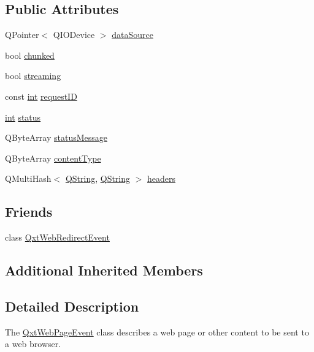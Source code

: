 \subsection*{Public Attributes}
\begin{DoxyCompactItemize}
\item 
Q\-Pointer$<$ Q\-I\-O\-Device $>$ \hyperlink{class_qxt_web_page_event_ae348a623f5b063e3dfa79ad4faf8ffd6}{data\-Source}
\item 
bool \hyperlink{class_qxt_web_page_event_a06310e86eecb41b64ea256acd0e0ff3b}{chunked}
\item 
bool \hyperlink{class_qxt_web_page_event_a7e523943475e8db70ddadc3b6303fe34}{streaming}
\item 
const \hyperlink{ioapi_8h_a787fa3cf048117ba7123753c1e74fcd6}{int} \hyperlink{class_qxt_web_page_event_a144c8010cc1c9d239bf5de4c72d09f7a}{request\-I\-D}
\item 
\hyperlink{ioapi_8h_a787fa3cf048117ba7123753c1e74fcd6}{int} \hyperlink{class_qxt_web_page_event_a3faa95fe00502400daa87a3a88e50d86}{status}
\item 
Q\-Byte\-Array \hyperlink{class_qxt_web_page_event_a4462b06516d2a680530b57dd37610da6}{status\-Message}
\item 
Q\-Byte\-Array \hyperlink{class_qxt_web_page_event_a10814905111a438f0a568e873b4aa6f1}{content\-Type}
\item 
Q\-Multi\-Hash$<$ \hyperlink{group___u_a_v_objects_plugin_gab9d252f49c333c94a72f97ce3105a32d}{Q\-String}, \hyperlink{group___u_a_v_objects_plugin_gab9d252f49c333c94a72f97ce3105a32d}{Q\-String} $>$ \hyperlink{class_qxt_web_page_event_a182c447e590bf659dc7592329fa34653}{headers}
\end{DoxyCompactItemize}
\subsection*{Friends}
\begin{DoxyCompactItemize}
\item 
class \hyperlink{class_qxt_web_page_event_a9f8bd36ab390863d9f86621b1b98ac60}{Qxt\-Web\-Redirect\-Event}
\end{DoxyCompactItemize}
\subsection*{Additional Inherited Members}


\subsection{Detailed Description}
The \hyperlink{class_qxt_web_page_event}{Qxt\-Web\-Page\-Event} class describes a web page or other content to be sent to a web browser. 

